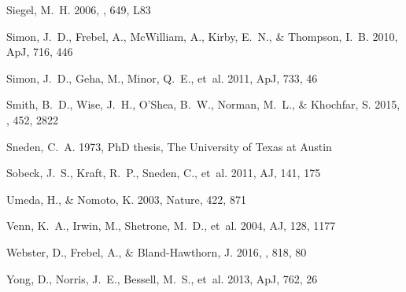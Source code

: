 \documentclass[]{emulateapj}
\begin{document}
\begin{thebibliography}{67}
{Siegel}, M.~H. 2006, \apjl, 649, L83

{Simon}, J.~D., {Frebel}, A., {McWilliam}, A., {Kirby}, E.~N., \& {Thompson},
  I.~B. 2010, ApJ, 716, 446

{Simon}, J.~D., {Geha}, M., {Minor}, Q.~E.,  {et~al.} 2011, ApJ, 733, 46

{Smith}, B.~D., {Wise}, J.~H., {O'Shea}, B.~W., {Norman}, M.~L., \& {Khochfar},
  S. 2015, \mnras, 452, 2822

{Sneden}, C.~A. 1973, PhD thesis, The University of Texas at Austin

{Sobeck}, J.~S., {Kraft}, R.~P., {Sneden}, C.,  {et~al.} 2011, AJ, 141, 175

Umeda, H., \& Nomoto, K. 2003, Nature, 422, 871

{Venn}, K.~A., {Irwin}, M., {Shetrone}, M.~D.,  {et~al.} 2004, AJ, 128, 1177

{Webster}, D., {Frebel}, A., \& {Bland-Hawthorn}, J. 2016, \apj, 818, 80

{Yong}, D., {Norris}, J.~E., {Bessell}, M.~S.,  {et~al.} 2013, ApJ, 762, 26

\end{thebibliography}
\end{document}
